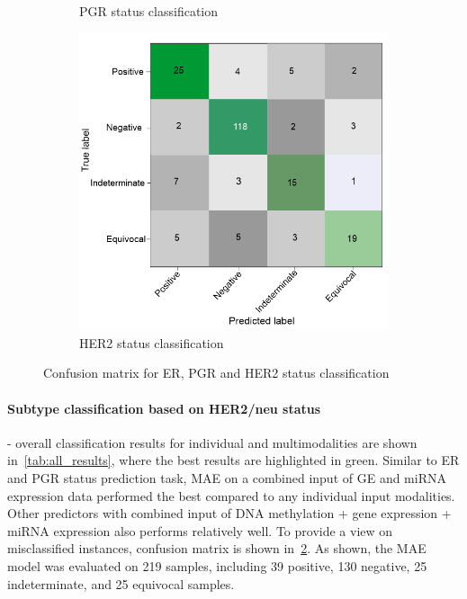 \begin{figure}[h]
\begin{subfigure}{.49\linewidth}
		\caption{PGR status classification}
        \label{fig:pgr_confusion}
	\end{subfigure}
	\begin{subfigure}{0.49\linewidth}
		\centering
		\includegraphics[scale=0.8]{images/conf_her2.png}
		\caption{HER2 status classification }
        \label{fig:her2_confusion}
	\end{subfigure}
	\caption{Confusion matrix for ER, PGR and HER2 status classification~\cite{karimACCESS2019}} 
	\label{fig:multi_cms}
\end{figure}

\paragraph{Subtype classification based on HER2/neu status} - overall classification results for individual and multimodalities are shown in~\cref{tab:all_results}, where the best results are highlighted in green. Similar to ER and PGR status prediction task, MAE on a combined input of GE and miRNA expression data performed the best compared to any individual input modalities. Other predictors with combined input of DNA methylation + gene expression + miRNA expression also performs relatively well. To provide a view on misclassified instances, confusion matrix is shown in~\cref{fig:her2_confusion}. As shown, the MAE model was evaluated on 219 samples, including 39 positive, 130 negative, 25 indeterminate, and 25 equivocal samples. 

